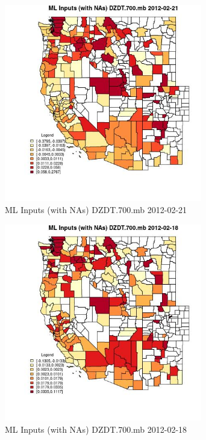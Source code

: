 \begin{figure} 
\centering  
\includegraphics[width=0.77\textwidth]{Code_Outputs/Report_ML_input_PM25_Step4_part_f_de_duplicated_aveswNAs_CountyDZDT700mbMean2012-02-21.jpg} 
\caption{\label{fig:Report_ML_input_PM25_Step4_part_f_de_duplicated_aveswNAsCountyDZDT700mbMean2012-02-21}ML Inputs (with NAs) DZDT.700.mb 2012-02-21} 
\end{figure} 
 

\begin{figure} 
\centering  
\includegraphics[width=0.77\textwidth]{Code_Outputs/Report_ML_input_PM25_Step4_part_f_de_duplicated_aveswNAs_CountyDZDT700mbMean2012-02-18.jpg} 
\caption{\label{fig:Report_ML_input_PM25_Step4_part_f_de_duplicated_aveswNAsCountyDZDT700mbMean2012-02-18}ML Inputs (with NAs) DZDT.700.mb 2012-02-18} 
\end{figure} 
 

